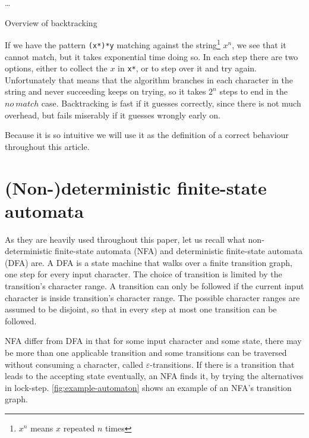 \documentclass[11pt,a4paper,twoside,openright]{Thesis}
\theoremstyle{definition}
\begin{document}
\begin{algorithm*}
  \begin{algorithmic}
      \State {}
      \State {}
        \State {}
      \Else
        \State {}
      \EndIf
    \ElsIf{\dots}
      \State \dots
    \EndIf
  \EndFunction
  \end{algorithmic}
  \caption{\label{alg:match-bt}Overview of backtracking}
\end{algorithm*}

If we have the pattern \texttt{(x*)*y} matching against the
string\footnote{$x^n$ means $x$ repeated $n$ times} $x^n$, we see that it
cannot match, but it takes exponential time doing so. In each step there
are two options, either to collect the $x$ in \texttt{x*}, or to step over it
and try again. Unfortunately that means that the algorithm branches in each
character in the string and never succeeding keeps on trying, so it takes $2^n$
steps to end in the $no\ match$ case.  Backtracking is fast if it guesses
correctly, since there is not much overhead, but fails miserably if it guesses
wrongly early on.

Because it is so intuitive we will use it as the definition of a correct 
behaviour throughout this article.

\section{(Non-)deterministic finite-state automata}
As they are heavily used throughout this paper, let us recall what
non-deterministic finite-state automata (NFA) and deterministic finite-state
automata (DFA) are. A DFA is a state machine that walks over a finite
transition graph, one step for every input character. The choice of transition
is limited by the transition's character range. A transition can only be
followed if the current input character is inside transition's character
range. The possible character ranges are assumed to be disjoint, so that in
every step at most one transition can be followed.

NFA differ from DFA in that for some input character and some state, there
may be more than one applicable transition and some transitions can be
traversed without consuming a character, called $\varepsilon$-transitions.  If
there is a transition that leads to the accepting state eventually, an NFA
finds it, by trying the alternatives in lock-step.
\autoref{fig:example-automaton} shows an example of an NFA's transition graph.
\end{document}
